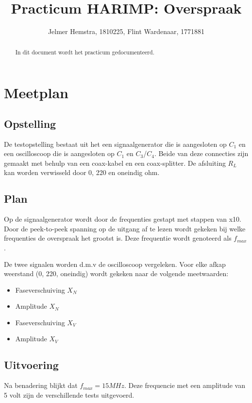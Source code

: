 \documentclass{article}
\title{Practicum HARIMP: Overspraak}
\author{Jelmer Hemstra, 1810225, Flint Wardenaar, 1771881}
\begin{document}
    \maketitle

    \begin{abstract}
        In dit document wordt het practicum gedocumenteerd.

    \end{abstract}


    \section{Meetplan}
        \subsection{Opstelling}

            De testopstelling bestaat uit het een signaalgenerator die is aangesloten op  \(C_1\) en een oscilloscoop die is aangesloten op \(C_1\) en \(C_3\)/\(C_4\).
            Beide van deze connecties zijn gemaakt met behulp van een coax-kabel en een coax-splitter. 
            De afsluiting \(R_L\) kan worden verwisseld door 0, 220 en oneindig ohm. 
        \subsection{Plan}
        
            Op de signaalgenerator wordt door de frequenties gestapt met stappen van x10.    
            Door de peek-to-peek spanning op de uitgang af te lezen wordt gekeken bij welke frequenties de overspraak het grootst is.
            Deze frequentie wordt genoteerd als \(f_{max}\).
            
            De twee signalen worden d.m.v de oscilloscoop vergeleken.
            Voor elke afkap weerstand (0, 220, oneindig) wordt gekeken naar de volgende meetwaarden:
            \begin{itemize}
                \item Faseverschuiving \(X_N\)
                \item Amplitude \(X_N\)
                \item Faseverschuiving \(X_V\)
                \item Amplitude \(X_V\)
            \end{itemize}
            

        \subsection{Uitvoering}
            Na benadering blijkt dat \(f_{max} = 15 MHz\).
            Deze frequencie met een amplitude van 5 volt zijn de verschillende tests uitgevoerd.
\end{document}
